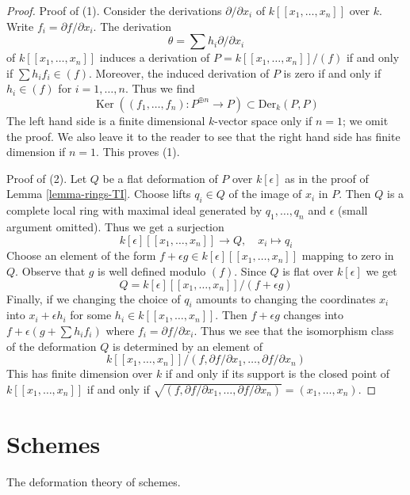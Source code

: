 \documentclass{stacks-project}
\theoremstyle{plain}
\theoremstyle{definition}
\theoremstyle{remark}
\numberwithin{equation}{subsection}
\def\Ker{\mathop{\mathrm{Ker}}}
\begin{document}
\begin{proof}
Proof of (1). Consider the derivations $\partial/\partial x_i$ of
$k[[x_1, \ldots, x_n]]$ over $k$. Write $f_i = \partial f/\partial x_i$.
The derivation
$$
\theta = \sum h_i \partial/\partial x_i
$$
of $k[[x_1, \ldots, x_n]]$
induces a derivation of $P = k[[x_1, \ldots, x_n]]/(f)$
if and only if
$\sum h_i f_i \in (f)$. Moreover, the induced derivation of $P$
is zero if and only if $h_i \in (f)$ for $i = 1, \ldots, n$.
Thus we find
$$
\Ker((f_1, \ldots, f_n) : P^{\oplus n} \longrightarrow P) \subset
\text{Der}_k(P, P)
$$
The left hand side is a finite dimensional $k$-vector space only if
$n = 1$; we omit the proof. We also leave it to the reader to see
that the right hand side has finite dimension if $n = 1$.
This proves (1).

\medskip\noindent
Proof of (2). Let $Q$ be a flat deformation of $P$ over $k[\epsilon]$
as in the proof of Lemma \ref{lemma-rings-TI}. Choose lifts $q_i \in Q$
of the image of $x_i$ in $P$. Then $Q$ is a complete local ring
with maximal ideal generated by $q_1, \ldots, q_n$ and $\epsilon$
(small argument omitted). Thus we get a surjection
$$
k[\epsilon][[x_1, \ldots, x_n]] \longrightarrow Q,\quad
x_i \longmapsto q_i
$$
Choose an element of the form
$f + \epsilon g \in k[\epsilon][[x_1, \ldots, x_n]]$
mapping to zero in $Q$. Observe that $g$ is well defined modulo $(f)$.
Since $Q$ is flat over $k[\epsilon]$ we get
$$
Q = k[\epsilon][[x_1, \ldots, x_n]]/(f + \epsilon g)
$$
Finally, if we changing the choice of $q_i$ amounts to
changing the coordinates $x_i$ into $x_i + \epsilon h_i$
for some $h_i \in k[[x_1, \ldots, x_n]]$. Then
$f + \epsilon g$ changes into $f + \epsilon (g + \sum h_i f_i)$
where $f_i = \partial f/\partial x_i$. Thus we see that the
isomorphism class of the deformation $Q$ is determined
by an element of
$$
k[[x_1, \ldots, x_n]]/
(f, \partial f/\partial x_1, \ldots,  \partial f/\partial x_n)
$$
This has finite dimension over $k$ if and only if
its support is the closed point of $k[[x_1, \ldots, x_n]]$
if and only if
$\sqrt{(f, \partial f/\partial x_1, \ldots,  \partial f/\partial x_n)} =
(x_1, \ldots, x_n)$.
\end{proof}






\section{Schemes}
\label{section-schemes}

\noindent
The deformation theory of schemes.
\end{document}
